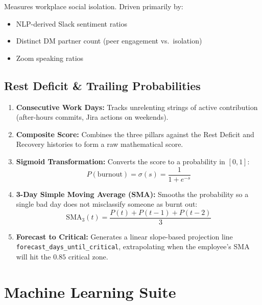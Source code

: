 \documentclass[12pt, a4paper, oneside]{report}
\begin{document}
Measures workplace social isolation. Driven primarily by:
\begin{itemize}
    \item NLP-derived Slack sentiment ratios
    \item Distinct DM partner count (peer engagement vs.\ isolation)
    \item Zoom speaking ratios
\end{itemize}

\section{Rest Deficit \& Trailing Probabilities}
\label{sec:restdeficit}

\begin{enumerate}
    \item \textbf{Consecutive Work Days:} Tracks unrelenting strings of active contribution (after-hours commits, Jira actions on weekends).

    \item \textbf{Composite Score:} Combines the three pillars against the Rest Deficit and Recovery histories to form a raw mathematical score.

    \item \textbf{Sigmoid Transformation:} Converts the score to a probability in $[0, 1]$:
    \[
        P(\text{burnout}) = \sigma(s) = \frac{1}{1 + e^{-s}}
    \]

    \item \textbf{3-Day Simple Moving Average (SMA):} Smooths the probability so a single bad day does not misclassify someone as burnt out:
    \[
        \text{SMA}_3(t) = \frac{P(t) + P(t-1) + P(t-2)}{3}
    \]

    \item \textbf{Forecast to Critical:} Generates a linear slope-based projection line \texttt{forecast\_days\_until\_critical}, extrapolating when the employee's SMA will hit the $0.85$ critical zone.
\end{enumerate}


\chapter{Machine Learning Suite}
\label{ch:ml}
\end{document}
